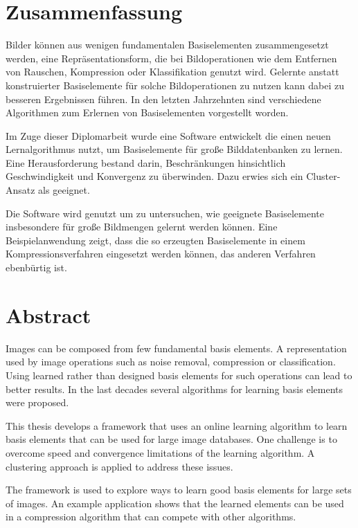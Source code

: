 \newpage
{}
{}
\chapter*{Zusammenfassung}
\thispagestyle{empty}

Bilder k\"{o}nnen aus wenigen fundamentalen Basiselementen zusammengesetzt
werden, eine Repr\"asentationsform, die bei Bildoperationen wie dem
Entfernen von Rauschen, Kompression oder Klassifikation genutzt wird.
Gelernte anstatt konstruierter Basiselemente f\"{u}r solche Bildoperationen zu
nutzen kann dabei zu besseren Ergebnissen f\"{u}hren. In den letzten Jahrzehnten
sind verschiedene Algorithmen zum Erlernen von Basiselementen vorgestellt
worden.

Im Zuge dieser Diplomarbeit wurde eine Software entwickelt die einen neuen
Lernalgorithmus nutzt, um Basiselemente f\"{u}r große Bilddatenbanken
zu lernen. Eine Herausforderung bestand darin, Beschr\"{a}nkungen hinsichtlich
Geschwindigkeit und Konvergenz zu überwinden. Dazu erwies sich ein
Cluster-Ansatz als geeignet.

Die Software wird genutzt um zu untersuchen, wie geeignete Basiselemente
insbesondere für große Bildmengen gelernt werden können. Eine Beispielanwendung
zeigt, dass die so erzeugten Basiselemente in einem Kompressionsverfahren
eingesetzt werden k\"{o}nnen, das anderen Verfahren ebenb\"{u}rtig ist. 

\newpage
{}
{}
\chapter*{Abstract}
\thispagestyle{empty}

Images can be composed from few fundamental basis elements. 
A representation used by image operations such as noise removal,
compression or classification. Using learned rather than designed basis elements
for such operations can lead to better results. In the last decades several
algorithms for learning basis elements were proposed.

This thesis develops a framework that uses an online learning
algorithm to learn basis elements that can be used for large image
databases. One challenge is to overcome speed and convergence limitations of the
learning algorithm. A clustering approach is applied to address these issues. 

The framework is used to explore ways to learn good basis elements for
large sets of images. An example application shows that the learned elements
can be used in a compression algorithm that can compete with other algorithms.


